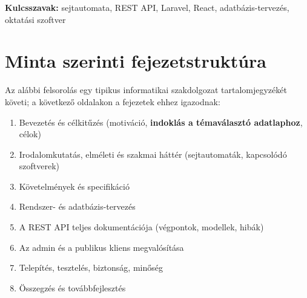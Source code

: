 \textbf{Kulcsszavak:} sejtautomata, REST API, Laravel, React, adatbázis-tervezés, oktatási szoftver

\chapter*{Minta szerinti fejezetstruktúra}
Az alábbi felsorolás egy tipikus informatikai szakdolgozat tartalomjegyzékét követi; a következő oldalakon a fejezetek ehhez igazodnak:
\begin{enumerate}
  \item Bevezetés és célkitűzés (motiváció, \textbf{indoklás a témaválasztó adatlaphoz}, célok)
  \item Irodalomkutatás, elméleti és szakmai háttér (sejtautomaták, kapcsolódó szoftverek)
  \item Követelmények és specifikáció
  \item Rendszer- és adatbázis-tervezés
  \item A REST API teljes dokumentációja (végpontok, modellek, hibák)
  \item Az admin és a publikus kliens megvalósítása
  \item Telepítés, tesztelés, biztonság, minőség
  \item Összegzés és továbbfejlesztés
\end{enumerate}

\tableofcontents
